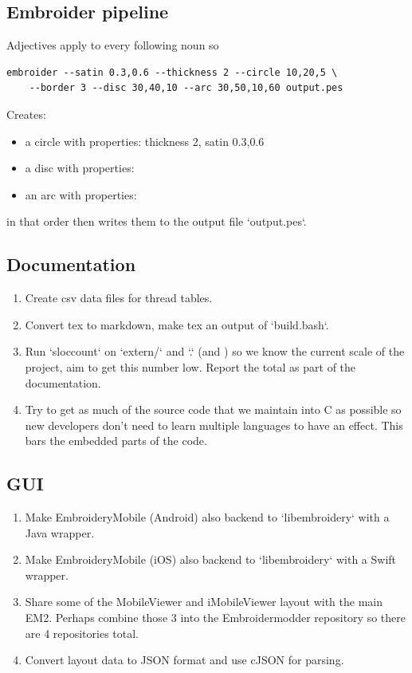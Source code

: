 \documentclass{report}
\begin{document}
\subsection{Embroider pipeline}

Adjectives apply to every following noun so

\begin{lstlisting}
embroider --satin 0.3,0.6 --thickness 2 --circle 10,20,5 \
    --border 3 --disc 30,40,10 --arc 30,50,10,60 output.pes
\end{lstlisting}

Creates:

\begin{itemize}
\item a circle with properties: thickness 2, satin 0.3,0.6
\item a disc with properties: 
\item an arc with properties:
\end{itemize}

in that order then writes them to the output file `output.pes`.

\subsection{Documentation}

\begin{enumerate}
\item Create csv data files for thread tables.
\item Convert tex to markdown, make tex an output of `build.bash`.
\item Run `sloccount` on `extern/` and `.` (and ) so we know the current scale of the project, aim to get this number low. Report the total as part of the documentation.
\item Try to get as much of the source code that we maintain into C as possible so new developers don't need to learn multiple languages to have an effect. This bars the embedded parts of the code. 
\end{enumerate}

\subsection{GUI}

\begin{enumerate}
\item Make EmbroideryMobile (Android) also backend to `libembroidery` with a Java wrapper.
\item Make EmbroideryMobile (iOS) also backend to `libembroidery` with a Swift wrapper.
\item Share some of the MobileViewer and iMobileViewer layout with the main EM2. Perhaps combine those 3 into the Embroidermodder repository so there are 4 repositories total.
\item Convert layout data to JSON format and use cJSON for parsing.
\end{enumerate}
\end{document}
